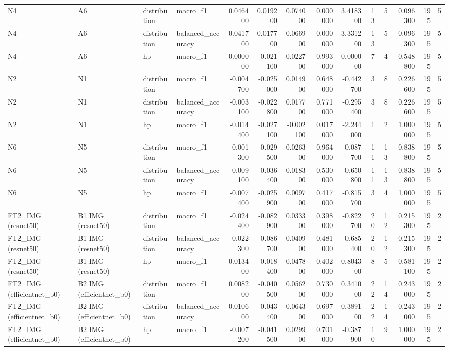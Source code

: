 \begin{table}
\begin{tabular}{llllrrrrrrrrrr}
N4 & A6 & distribution & macro\_f1 & 0.046400 & 0.019200 & 0.074000 & 0.000000 & 3.418300 & 13 & 5 & 0.096300 & 195 & 5 \\
N4 & A6 & distribution & balanced\_accuracy & 0.041700 & 0.017700 & 0.066900 & 0.000000 & 3.331200 & 13 & 5 & 0.096300 & 195 & 5 \\
N4 & A6 & hp & macro\_f1 & 0.000000 & -0.021100 & 0.022700 & 0.993000 & 0.000000 & 7 & 4 & 0.548800 & 195 & 5 \\
N2 & N1 & distribution & macro\_f1 & -0.004700 & -0.025000 & 0.014900 & 0.648000 & -0.442700 & 3 & 8 & 0.226600 & 195 & 5 \\
N2 & N1 & distribution & balanced\_accuracy & -0.003100 & -0.022800 & 0.017700 & 0.771000 & -0.295400 & 3 & 8 & 0.226600 & 195 & 5 \\
N2 & N1 & hp & macro\_f1 & -0.014400 & -0.027100 & -0.002100 & 0.017000 & -2.244000 & 1 & 2 & 1.000000 & 195 & 5 \\
N6 & N5 & distribution & macro\_f1 & -0.001300 & -0.029500 & 0.026300 & 0.964000 & -0.087700 & 11 & 13 & 0.838800 & 195 & 5 \\
N6 & N5 & distribution & balanced\_accuracy & -0.009100 & -0.036400 & 0.018300 & 0.530000 & -0.650800 & 11 & 13 & 0.838800 & 195 & 5 \\
N6 & N5 & hp & macro\_f1 & -0.007400 & -0.025900 & 0.009700 & 0.417000 & -0.815700 & 3 & 4 & 1.000000 & 195 & 5 \\
FT2\_IMG (resnet50) & B1 IMG (resnet50) & distribution & macro\_f1 & -0.024400 & -0.082900 & 0.033300 & 0.398000 & -0.822700 & 20 & 12 & 0.215300 & 195 & 2 \\
FT2\_IMG (resnet50) & B1 IMG (resnet50) & distribution & balanced\_accuracy & -0.022300 & -0.086700 & 0.040900 & 0.481000 & -0.685400 & 20 & 12 & 0.215300 & 195 & 2 \\
FT2\_IMG (resnet50) & B1 IMG (resnet50) & hp & macro\_f1 & 0.013400 & -0.018400 & 0.047800 & 0.402000 & 0.804300 & 8 & 5 & 0.581100 & 195 & 2 \\
FT2\_IMG (efficientnet\_b0) & B2 IMG (efficientnet\_b0) & distribution & macro\_f1 & 0.008200 & -0.040500 & 0.056200 & 0.730000 & 0.341000 & 22 & 14 & 0.243000 & 195 & 2 \\
FT2\_IMG (efficientnet\_b0) & B2 IMG (efficientnet\_b0) & distribution & balanced\_accuracy & 0.010600 & -0.043400 & 0.064300 & 0.697000 & 0.389100 & 22 & 14 & 0.243000 & 195 & 2 \\
FT2\_IMG (efficientnet\_b0) & B2 IMG (efficientnet\_b0) & hp & macro\_f1 & -0.007200 & -0.041500 & 0.029900 & 0.701000 & -0.387900 & 10 & 9 & 1.000000 & 195 & 2 \\

\end{tabular}
\end{table}
